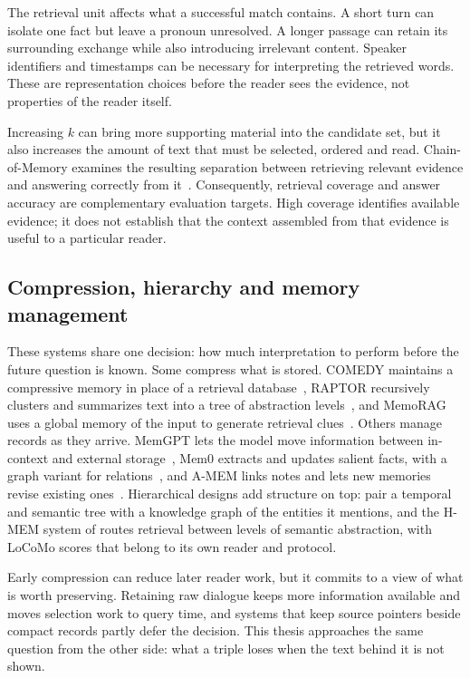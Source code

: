 The retrieval unit affects what a successful match contains. A short turn can isolate one
fact but leave a pronoun unresolved. A longer passage can retain its surrounding exchange
while also introducing irrelevant content. Speaker identifiers and timestamps can be
necessary for interpreting the retrieved words. These are representation choices before
the reader sees the evidence, not properties of the reader itself.

Increasing $k$ can bring more supporting material into the candidate set, but it also
increases the amount of text that must be selected, ordered and read. Chain-of-Memory
examines the resulting separation between retrieving relevant evidence and answering
correctly from it~\citep{chain_of_memory}. Consequently, retrieval coverage and answer
accuracy are complementary evaluation targets. High coverage identifies available
evidence; it does not establish that the context assembled from that evidence is useful
to a particular reader.

\subsection{Compression, hierarchy and memory management}

These systems share one decision: how much interpretation to perform before the future
question is known. Some compress what is stored. COMEDY maintains a compressive memory in
place of a retrieval database~\citep{comedy}, RAPTOR recursively clusters and summarizes text
into a tree of abstraction levels~\citep{raptor}, and MemoRAG uses a global memory of the input
to generate retrieval clues~\citep{memorag}. Others manage records as they arrive. MemGPT lets
the model move information between in-context and external storage~\citep{memgpt}, Mem0
extracts and updates salient facts, with a graph variant for relations~\citep{mem0}, and A-MEM
links notes and lets new memories revise existing ones~\citep{amem}. Hierarchical designs add
structure on top: \citet{hmem_yu2026} pair a temporal and semantic tree with a knowledge graph
of the entities it mentions, and the H-MEM system of \citet{hmem_sun2025} routes retrieval
between levels of semantic abstraction, with LoCoMo scores that belong to its own reader and
protocol.

Early compression can reduce later reader work, but it commits to a view of what is worth
preserving. Retaining raw dialogue keeps more information available and moves selection work
to query time, and systems that keep source pointers beside compact records partly defer the
decision. This thesis approaches the same question from the other side: what a triple loses
when the text behind it is not shown.

